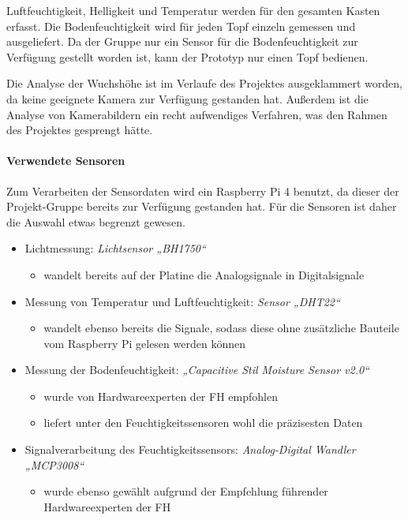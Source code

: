 Luftfeuchtigkeit, Helligkeit und Temperatur werden für den gesamten
Kasten erfasst. Die Bodenfeuchtigkeit wird für jeden Topf einzeln
gemessen und ausgeliefert. Da der Gruppe nur ein Sensor für die
Bodenfeuchtigkeit zur Verfügung gestellt worden ist, kann der Prototyp
nur einen Topf bedienen.

Die Analyse der Wuchshöhe ist im Verlaufe des Projektes ausgeklammert
worden, da keine geeignete Kamera zur Verfügung gestanden hat. Außerdem
ist die Analyse von Kamerabildern ein recht aufwendiges Verfahren, was
den Rahmen des Projektes gesprengt hätte.

\hypertarget{verwendete-sensoren}{%
\paragraph{Verwendete Sensoren}\label{verwendete-sensoren}}

Zum Verarbeiten der Sensordaten wird ein Raspberry Pi 4 benutzt, da
dieser der Projekt-Gruppe bereits zur Verfügung gestanden hat. Für die
Sensoren ist daher die Auswahl etwas begrenzt gewesen.

\begin{itemize}
\tightlist
\item
  Lichtmessung: \emph{Lichtsensor „BH1750``}

  \begin{itemize}
  \tightlist
  \item
    wandelt bereits auf der Platine die Analogsignale in Digitalsignale
  \end{itemize}
\item
  Messung von Temperatur und Luftfeuchtigkeit: \emph{Sensor „DHT22``}

  \begin{itemize}
  \tightlist
  \item
    wandelt ebenso bereits die Signale, sodass diese ohne zusätzliche
    Bauteile vom Raspberry Pi gelesen werden können
  \end{itemize}
\item
  Messung der Bodenfeuchtigkeit: \emph{„Capacitive Stil Moisture Sensor
  v2.0``}

  \begin{itemize}
  \tightlist
  \item
    wurde von Hardwareexperten der FH empfohlen
  \item
    liefert unter den Feuchtigkeitssensoren wohl die präzisesten Daten
  \end{itemize}
\item
  Signalverarbeitung des Feuchtigkeitssensors: \emph{Analog-Digital
  Wandler „MCP3008``}

  \begin{itemize}
  \tightlist
  \item
    wurde ebenso gewählt aufgrund der Empfehlung führender
    Hardwareexperten der FH
  \end{itemize}
\end{itemize}

